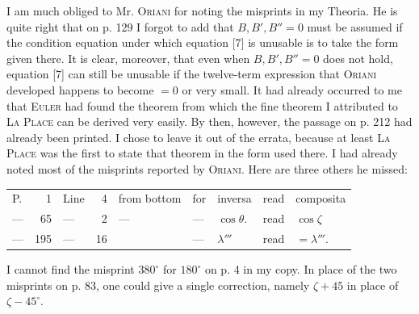 \par\indent I am much obliged to Mr. \textsc{Oriani} for noting the misprints in my Theoria. He is quite right that on p. 129 I forgot to add that $B, B', B'' = 0$ must be assumed
 if the condition equation under which equation [7] is unusable is to take the form given there. It is clear, moreover, that even when $B, B', B''=0$ does not hold, equation [7] can still be unusable if the twelve-term expression that \textsc{Oriani} developed happens to become $=0$ or very small. It had already occurred to me that \textsc{Euler} had found the theorem from which the fine theorem I attributed to \textsc{La Place} can be derived very easily. By then, however, the passage on p. 212 had already been printed. I chose to leave it out of the errata, because at least \textsc{La Place} was the first to state that theorem in the form used there. I had already noted most of the misprints reported by \textsc{Oriani}. Here are three others he missed:

\begin{center}\fontsize{10}{12}\selectfont\setlength{\tabcolsep}{5pt}\renewcommand{\arraystretch}{1.15}\begin{tabular}{lrlrlllll}
P. & 1 & Line & 4 & from bottom & for & inversa & read & composita\\
--- & 65 & --- & 2 & --- & --- & $\cos\theta$. & read & $\cos\zeta$\\
--- & 195 & --- & 16 &  & --- & $\lambda'''$ & read & $=\lambda'''$.\\
\end{tabular}\end{center}

\par\indent I cannot find the misprint $380^\circ$ for $180^\circ$ on p. 4 in my copy. In place of the two misprints on p. 83, one could give a single correction, namely $\zeta+45$ in place of $\zeta-45^\circ$.
